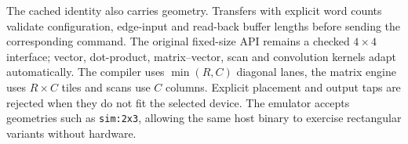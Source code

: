 The cached identity also carries geometry. Transfers with explicit word counts
validate configuration, edge-input and read-back buffer lengths before sending
the corresponding command. The original fixed-size API remains a checked
$4\times4$ interface; vector, dot-product, matrix--vector, scan and convolution kernels adapt
automatically.
The compiler uses $\min(R,C)$ diagonal lanes, the matrix engine uses
$R\times C$ tiles and scans use $C$ columns. Explicit placement and output taps
are rejected when they do not fit the selected device. The emulator accepts
geometries such as \texttt{sim:2x3}, allowing the same host binary to exercise
rectangular variants without hardware.



